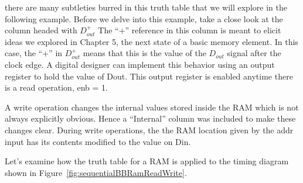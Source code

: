 there are many subtleties burred in this truth table that we will explore in the following example.  Before
we delve into this example,
take a close look at the column headed with $D_{out}^+$  The ``+'' reference in this column is meant to
elicit ideas we explored
in Chapter 5, the next state of a basic memory element.  In this case, the ``+'' in $D_{out}^+$ means that
this is the value of the
$D_{out}$ signal after the clock edge.  A digital designer can implement this behavior using an output register to
hold the value of Dout.  This output register is enabled anytime there is a read operation, enb = 1.

A write operation changes the internal values stored inside the RAM which is not always explicitly obvious.  Hence a
``Internal'' column was included to make these changes clear.  During write operations, the the RAM location given by
the addr input has its contents modified to the value on Din.

Let's examine how the truth table for a RAM is applied to the timing diagram shown in
Figure~\ref{fig:sequentialBBRamReadWrite}.

